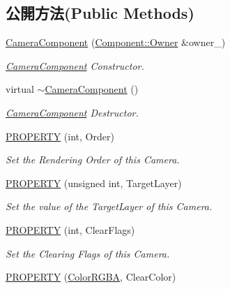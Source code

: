 \subsection*{公開方法(Public Methods)}
\begin{DoxyCompactItemize}
\item 
\hyperlink{class_i_dream_sky_1_1_camera_component_ab6a56dfe932d9ddad1df9c0ffe0a329f}{Camera\+Component} (\hyperlink{class_i_dream_sky_1_1_component_1_1_owner}{Component\+::\+Owner} \&owner\+\_\+)
\begin{DoxyCompactList}\small\item\em \hyperlink{class_i_dream_sky_1_1_camera_component}{Camera\+Component} Constructor. \end{DoxyCompactList}\item 
virtual \hyperlink{class_i_dream_sky_1_1_camera_component_a977e080c45152719c5e6335cfb0698fc}{$\sim$\+Camera\+Component} ()
\begin{DoxyCompactList}\small\item\em \hyperlink{class_i_dream_sky_1_1_camera_component}{Camera\+Component} Destructor. \end{DoxyCompactList}\item 
\hyperlink{class_i_dream_sky_1_1_camera_component_aff63c658ccd2a68476b97079b8ce1390}{P\+R\+O\+P\+E\+R\+TY} (int, Order)
\begin{DoxyCompactList}\small\item\em Set the Rendering Order of this Camera. \end{DoxyCompactList}\item 
\hyperlink{class_i_dream_sky_1_1_camera_component_a772135f28ad4c626a2d83ded89cba672}{P\+R\+O\+P\+E\+R\+TY} (unsigned int, Target\+Layer)
\begin{DoxyCompactList}\small\item\em Set the value of the Target\+Layer of this Camera. \end{DoxyCompactList}\item 
\hyperlink{class_i_dream_sky_1_1_camera_component_aeb3558e5c4cbb8928e164a36a47b2d91}{P\+R\+O\+P\+E\+R\+TY} (int, Clear\+Flags)
\begin{DoxyCompactList}\small\item\em Set the Clearing Flags of this Camera. \end{DoxyCompactList}\item 
\hyperlink{class_i_dream_sky_1_1_camera_component_a05f48baa4acd86d534827d0de914e7e5}{P\+R\+O\+P\+E\+R\+TY} (\hyperlink{class_i_dream_sky_1_1_color_r_g_b_a}{Color\+R\+G\+BA}, Clear\+Color)

\end{DoxyCompactItemize}

